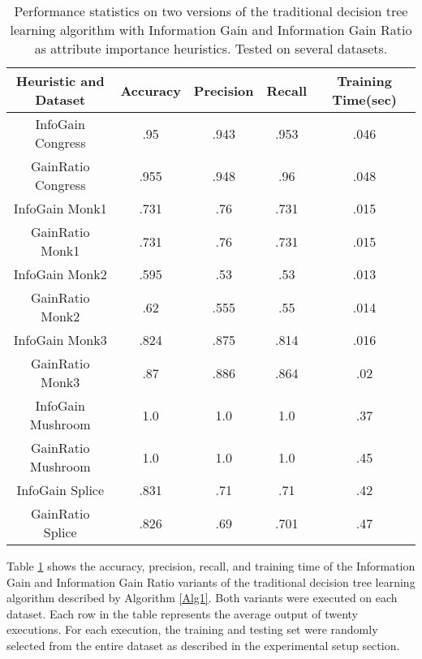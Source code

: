 \documentclass[12pt, letterpaper]{article}
\begin{document}
\begin{table}
\caption {Information Gain vs Information Gain Ratio} \label{IG_IGR} 
\begin{center}
\begin{tabular}{|c||c|c|c|c|}
\hline
Heuristic and Dataset & Accuracy & Precision & Recall & Training Time(sec)\\
\hline \hline
InfoGain Congress & .95 & .943 & .953 & .046 \\
\hline 
GainRatio Congress & .955 & .948 & .96 & .048\\
\hline 
InfoGain Monk1 & .731 &  .76 & .731 & .015\\
\hline
GainRatio Monk1 & .731 & .76 & .731 & .015\\
\hline 
InfoGain Monk2 & .595 &  .53 & .53 & .013\\
\hline
GainRatio Monk2 & .62 & .555 & .55 & .014\\
\hline 
InfoGain Monk3 & .824 &  .875 & .814 & .016\\
\hline
GainRatio Monk3 & .87 & .886 & .864 & .02\\
\hline 
InfoGain Mushroom & 1.0 &  1.0 & 1.0 & .37\\
\hline
GainRatio Mushroom & 1.0 & 1.0 & 1.0 & .45\\
\hline 
InfoGain Splice & .831 &  .71 & .71 & .42\\
\hline
GainRatio Splice & .826 & .69 & .701 & .47\\
\hline 
\end{tabular}
\end{center}
\caption{Performance statistics on two versions of the traditional decision tree learning
algorithm with Information Gain and Information Gain Ratio as attribute importance heuristics. Tested on
several datasets.}
\end{table}

Table \ref{IG_IGR} shows the accuracy, precision, recall, and training time of the Information Gain
and Information Gain Ratio variants of the traditional decision tree learning algorithm described by Algorithm
\ref{Alg1}.  Both variants were executed on each dataset.  Each row in the table represents the 
average output of twenty executions.  For each execution, the training and testing set were 
randomly selected from the entire dataset as described in the experimental setup section.


\end{document}

